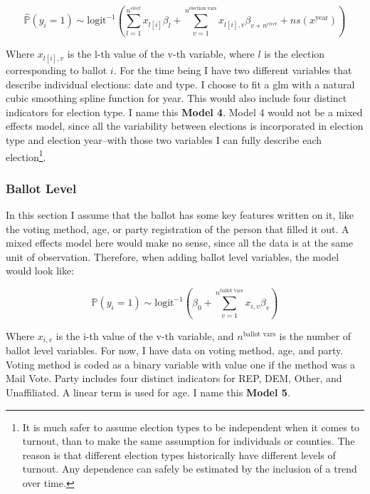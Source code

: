 \documentclass[12pt,twoside]{reedthesis}
\begin{document}
  \begin{equation} \tag{Model 4}
  \hat{\mathbb{P}}(y_i = 1) \sim \text{logit}^{-1}(\sum_{l = 1}^{n^{elect}}x_{l[i]}\beta_{l} + \sum_{v=1}^{n^{\text{election vars}}}x_{l[i], v}\beta_{v+n^{elect}} + ns(x^{\text{year}}))
  \end{equation}
  
  Where \(x_{l[i], v}\) is the l-th value of the v-th variable, where
  \(l\) is the election corresponding to ballot \(i\). For the time being
  I have two different variables that describe individual elections: date
  and type. I choose to fit a glm with a natural cubic smoothing spline
  function for year. This would also include four distinct indicators for
  election type. I name this \textbf{Model 4}. Model 4 would not be a
  mixed effects model, since all the variability between elections is
  incorporated in election type and election year--with those two
  variables I can fully describe each election\footnote{It is much safer
    to assume election types to be independent when it comes to turnout,
    than to make the same assumption for individuals or counties. The
    reason is that different election types historically have different
    levels of turnout. Any dependence can safely be estimated by the
    inclusion of a trend over time.}.
  
  \subsubsection{Ballot Level}\label{ballot-level}
  
  In this section I assume that the ballot has some key features written
  on it, like the voting method, age, or party registration of the person
  that filled it out. A mixed effects model here would make no sense,
  since all the data is at the same unit of observation. Therefore, when
  adding ballot level variables, the model would look like:
  
  \begin{equation} \tag{Model 5}
  \hat{\mathbb{P}}(y_i = 1) \sim \text{logit}^{-1}(\beta_0 + \sum_{v = 1}^{n^{\text{ballot vars}}}x_{i,v}\beta_{v})
  \end{equation}
  
  Where \(x_{i,v}\) is the i-th value of the v-th variable, and
  \(n^{\text{ballot vars}}\) is the number of ballot level variables. For
  now, I have data on voting method, age, and party. Voting method is
  coded as a binary variable with value one if the method was a Mail Vote.
  Party includes four distinct indicators for REP, DEM, Other, and
  Unaffiliated. A linear term is used for age. I name this \textbf{Model
  5}.
  
\end{document}
